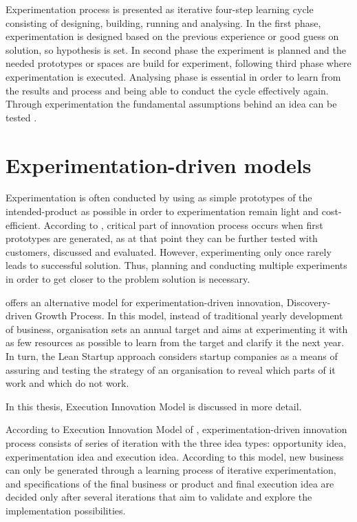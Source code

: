 Experimentation process is presented as iterative four-step learning cycle consisting of designing, building, running and analysing. In the first phase, experimentation is designed based on the previous experience or good guess on solution, so hypothesis is set. In second phase the experiment is planned and the needed prototypes or spaces are build for experiment, following third phase where experimentation is executed. Analysing phase is essential in order to learn from the results and process and being able to conduct the cycle effectively again. \citep{thomke1998managing} Through experimentation the fundamental assumptions behind an idea can be tested \citep{tuulenmaki2011art}.

\section{Experimentation-driven models}
Experimentation is often conducted by using as simple prototypes of the intended-product as possible in order to experimentation remain light and cost-efficient. According to \citet{thomke2001enlightened}, critical part of innovation process occurs when first prototypes are generated, as at that point they can be further tested with customers, discussed and evaluated. However, experimenting only once rarely leads to successful solution. Thus, planning and conducting multiple experiments in order to get closer to the problem solution is necessary. \citep{thomke1998modes} 

\citet{mcgrath2010business} offers an alternative model for experimentation-driven innovation, Discovery-driven Growth Process. In this model, instead of traditional yearly development of business, organisation sets an annual target and aims at experimenting it with as few resources as possible to learn from the target and clarify it the next year. In turn, the Lean Startup approach considers startup companies as a means of assuring and testing the strategy of an organisation to reveal which parts of it work and which do not work. \citep{ries2011lean}

In this thesis, Execution Innovation Model is discussed in more detail. 

According to Execution Innovation Model of \citet{tuulenmaki2011art}, experimentation-driven innovation process consists of series of iteration with the three idea types: opportunity idea, experimentation idea and execution idea. According to this model, new business can only be generated through a learning process of iterative experimentation, and specifications of the final business or product and final execution idea are decided only after several iterations that aim to validate and explore the implementation possibilities. \citep{tuulenmaki2011art} 

